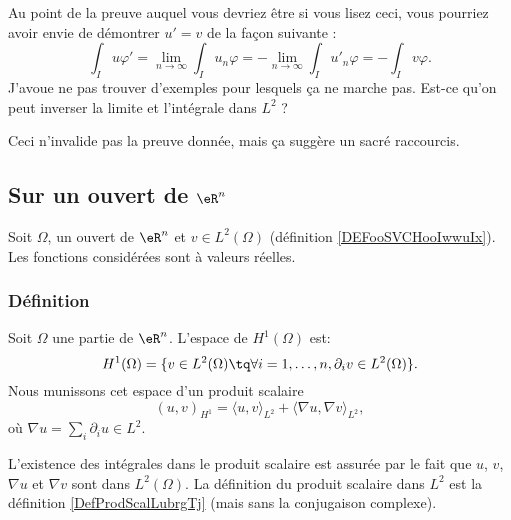 \begin{probleme}    \label{ProbTOElufz}
    Au point de la preuve auquel vous devriez être si vous lisez ceci, vous pourriez avoir envie de démontrer \( u'=v\) de la façon suivante :
    \begin{equation}
        \int_I u\varphi'=\lim_{n\to \infty} \int_Iu_n\varphi=-\lim_{n\to \infty} \int_Iu'_n\varphi=-\int_Iv\varphi.
    \end{equation}
    J'avoue ne pas trouver d'exemples pour lesquels ça ne marche pas. Est-ce qu'on peut inverser la limite et l'intégrale dans \( L^2\) ?

    Ceci n'invalide pas la preuve donnée, mais ça suggère un sacré raccourcis.
\end{probleme}

\subsection{Sur un ouvert de \( \eR^n\)}

Soit \( \Omega\), un ouvert de \( \eR^n\) et \( v\in L^2(\Omega)\) (définition \ref{DEFooSVCHooIwwuIx}). Les fonctions considérées sont à valeurs réelles.


\subsubsection{Définition}

\begin{definition}
    Soit \( \Omega\) une partie de \( \eR^n\). L'espace de  \( H^1(\Omega)\) est:
    \begin{equation}
        H^1(\Omega)=\{ v\in L^2(\Omega)\tq \forall i=1,\ldots, n, \partial_iv\in L^2(\Omega) \}.
    \end{equation}
    Nous munissons cet espace d'un produit scalaire
    \begin{equation}
        (u,v)_{H^1}=\langle u, v\rangle_{L^2}+\langle \nabla u, \nabla v\rangle_{L^2},
    \end{equation}
    où \( \nabla u=\sum_i\partial_iu\in L^2\).
\end{definition}
L'existence des intégrales dans le produit scalaire est assurée par le fait que \( u\), \( v\), \( \nabla u\) et \( \nabla v\) sont dans \( L^2(\Omega)\). La définition du produit scalaire dans \( L^2\) est la définition \ref{DefProdScalLubrgTj} (mais sans la conjugaison complexe).

